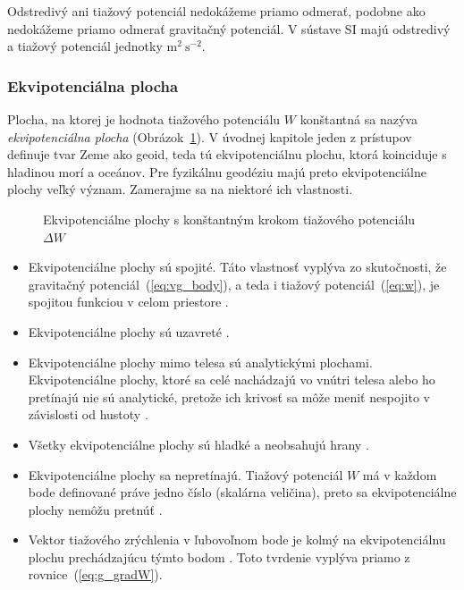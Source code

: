 \documentclass[a4paper, 12pt]{book}
\begin{document}
Odstredivý ani tiažový potenciál nedokážeme priamo odmerať, podobne ako 
nedokážeme priamo odmerať gravitačný potenciál.  V sústave SI majú odstredivý 
a tiažový potenciál jednotky $\mathrm{m}^2 \ \mathrm{s}^{-2}$.

\subsubsection{Ekvipotenciálna plocha}

Plocha, na ktorej je hodnota tiažového potenciálu $W$ konštantná sa nazýva 
\emph{ekvipotenciálna plocha} (Obrázok~\ref{fig:equipotential_surfaces}).  
V úvodnej kapitole jeden z prístupov definuje tvar Zeme ako geoid, teda tú 
ekvipotenciálnu plochu, ktorá koinciduje s hladinou morí a oceánov.  Pre 
fyzikálnu geodéziu majú preto ekvipotenciálne plochy veľký význam.  Zamerajme 
sa na niektoré ich vlastnosti.

\begin{figure}
\centering

\caption{Ekvipotenciálne plochy s konštantným krokom tiažového potenciálu 
$\Delta W$}
\label{fig:equipotential_surfaces}
\end{figure}

\begin{itemize}
\item Ekvipotenciálne plochy sú spojité.  Táto vlastnosť vyplýva zo 
skutočnosti, že gravitačný potenciál~(\ref{eq:vg_body}), a teda i tiažový 
potenciál~(\ref{eq:w}), je spojitou funkciou v celom priestore 
\citep{Janak2006}.

\item Ekvipotenciálne plochy sú uzavreté \citep{VanicekGeodesy}.

\item Ekvipotenciálne plochy mimo telesa sú analytickými plochami.  
Ekvipotenciálne plochy, ktoré sa celé nachádzajú vo vnútri telesa alebo ho 
pretínajú nie sú analytické, pretože ich krivosť sa môže meniť nespojito 
v závislosti od hustoty \citep{MoritzPhysicalGeodesy}.

\item Všetky ekvipotenciálne plochy sú hladké a neobsahujú hrany 
\citep{MoritzPhysicalGeodesy}.

\item Ekvipotenciálne plochy sa nepretínajú.  Tiažový potenciál $W$ má v každom 
bode definované práve jedno číslo (skalárna veličina), preto sa ekvipotenciálne 
plochy nemôžu pretnúť \citep{MacMillan1930}.

\item Vektor tiažového zrýchlenia v ľubovoľnom bode je kolmý na ekvipotenciálnu 
plochu prechádzajúcu týmto bodom \citep{MoritzPhysicalGeodesy}.  Toto tvrdenie 
vyplýva priamo z rovnice~(\ref{eq:g_gradW}).
\end{itemize}
\end{document}
